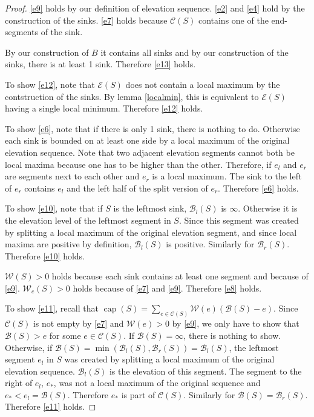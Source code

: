 \documentclass[11pt,a4paper]{article}
\DeclareMathOperator{\capp}{cap}
\begin{document}
\begin{proof}
\ref{e9} holds by our definition of elevation sequence.
\ref{e2} and \ref{e4} hold by the construction of the sinks. 
\ref{e7} holds because $\mathcal{C}(S)$ contains one of the end-segments of the sink.

By our construction of $B$ it contains all sinks and by our construction of the sinks, there is at least 1 sink.
Therefore \ref{e13} holds.

To show \ref{e12}, note that $\mathcal{E}(S)$ does not contain a local maximum by the contstruction of the sinks.
By lemma \ref{localmin}, this is equivalent to $\mathcal{E}(S)$ having a single local minimum.
Therefore \ref{e12} holds.

To show \ref{e6}, note that if there is only 1 sink, there is nothing to do.
Otherwise each sink is bounded on at least one side by a local maximum of the original elevation sequence.
Note that two adjacent elevation segments cannot both be local maxima because one has to be higher than the other.
Therefore, if $e_l$ and $e_r$ are segments next to each other and $e_r$ is a local maximum.
The sink to the left of $e_r$ contains $e_l$ and the left half of the split version of $e_r$.
Therefore \ref{e6} holds.

To show \ref{e10}, note that if $S$ is the leftmost sink, $\mathcal{B}_l(S)$ is $\infty$.
Otherwise it is the elevation level of the leftmost segment in $S$.
Since this segment was created by splitting a local maximum of the original elevation segment, and since local maxima are positive by definition, $\mathcal{B}_l(S)$ is positive.
Similarly for $\mathcal{B}_r(S)$.
Therefore \ref{e10} holds.

$\mathcal{W}(S) > 0$ holds because each sink contains at least one segment and because of \ref{e9}.
$\mathcal{W}_c(S) > 0$ holds because of \ref{e7} and \ref{e9}.
Therefore \ref{e8} holds.

To show \ref{e11}, recall that $\capp(S) = \sum_{e\in\mathcal{C}(S)} \mathcal{W}(e)(\mathcal{B}(S)-e)$.
Since $\mathcal{C}(S)$ is not empty by \ref{e7} and $\mathcal{W}(e) > 0$ by \ref{e9}, we only have
to show that $\mathcal{B}(S) > e$ for some $e\in\mathcal{C}(S)$.
If $\mathcal{B}(S)=\infty$, there is nothing to show.
Otherwise, if $\mathcal{B}(S) = \min(\mathcal{B}_l(S), \mathcal{B}_r(S)) = \mathcal{B}_l(S)$, the leftmost segment $e_l$ in $S$ was created by splitting a local maximum of the original elevation sequence.
$\mathcal{B}_l(S)$ is the elevation of this segment.
The segment to the right of $e_l$, $e_*$, was not a local maximum of the original sequence and $e_* < e_l = \mathcal{B}(S)$.
Therefore $e_*$ is part of $\mathcal{C}(S)$.
Similarly for $\mathcal{B}(S) = \mathcal{B}_r(S)$.
Therefore \ref{e11} holds.


\end{proof}
\end{document}
